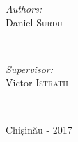 \begin{titlepage}
\begin{center}
      \vspace{20mm}

      \begin{minipage}{0.4\textwidth}
      \begin{flushleft} \large
      \emph{Authors:}\\
      Daniel \textsc{Surdu}
      \end{flushleft}
      \end{minipage}
      ~
      \begin{minipage}{0.4\textwidth}
      \begin{flushright} \large
      \emph{Supervisor:} \\
      Victor \textsc{Istratii} %
      \end{flushright}
      \end{minipage}\\[4cm]

      \vspace{5 mm}
      
      \large Chișinău - 2017






      \vfill %
      \end{center}
      
\end{titlepage}
